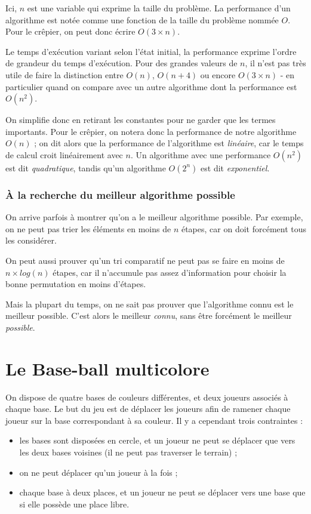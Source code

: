 \documentclass[a5paper,pagesize,DIV=14]{scrbook}
\begin{document}
Ici, $n$ est une variable qui exprime la taille du problème. La performance d'un algorithme est notée comme une fonction de la taille du problème nommée $O$. Pour le crêpier, on peut donc écrire $O(3 \times n)$.

Le temps d'exécution variant selon l'état initial, la performance exprime l'ordre de grandeur du temps d'exécution. Pour des grandes valeurs de $n$, il n'est pas très utile de faire la distinction entre $O(n)$, $O(n+4)$ ou encore $O(3 \times n)$ - en particulier quand on compare avec un autre algorithme dont la performance est $O(n^2)$. 

On simplifie donc en retirant les constantes pour ne garder que les termes importants. Pour le crêpier, on notera donc la performance de notre algorithme $O(n)$ ; on dit alors que la performance de l'algorithme est \textit{linéaire}, car le temps de calcul croit linéairement avec $n$. Un algorithme avec une performance $O(n^2)$ est dit \textit{quadratique}, tandis qu'un algorithme $O(2^n)$ est dit \textit{exponentiel}.

\subsection*{À la recherche du meilleur algorithme possible}

On arrive parfois à montrer qu'on a le meilleur algorithme possible. Par exemple, on ne peut pas trier les éléments en moins de $n$ étapes, car on doit forcément tous les considérer.

On peut aussi prouver qu'un tri comparatif ne peut pas se faire en moins de $n\times log(n)$ étapes, car il n'accumule pas assez d'information pour choisir la bonne permutation en moins d'étapes.

Mais la plupart du temps, on ne sait pas prouver que l'algorithme connu est le meilleur possible. C'est alors le meilleur \textit{connu}, sans être forcément le meilleur \textit{possible}.
    
\chapter*{Le Base-ball multicolore}

On dispose de quatre bases de couleurs différentes, et deux joueurs associés à chaque base. Le but du jeu est de déplacer les joueurs afin de ramener chaque joueur sur la base correspondant à sa couleur. Il y a cependant trois contraintes :

\begin{itemize}
  \item les bases sont disposées en cercle, et un joueur ne peut se déplacer que vers les deux bases voisines (il ne peut pas traverser le terrain) ;
  \item on ne peut déplacer qu'un joueur à la fois ;
  \item chaque base à deux places, et un joueur ne peut se déplacer vers une base que si elle possède une place libre.
\end{itemize}
\end{document}
